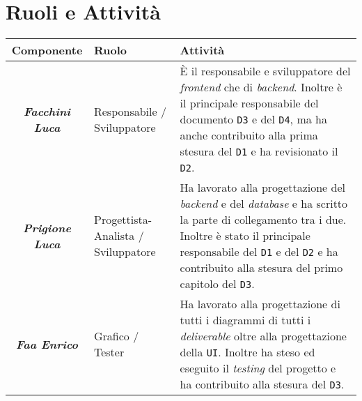 \chapter{Ruoli e Attività}
\begin{table}[H]
    \centering
    \begin{tabular}{|c|p{10em}|p{24em}|}
        \hline
        \textbf{Componente} & \textbf{Ruolo} & \textbf{Attività} \\
        \hline 
        \textbf{\textit{Facchini Luca}} & Responsabile / Sviluppatore & È il responsabile e sviluppatore del \textit{frontend} che di \textit{backend}. Inoltre è il principale responsabile del documento \texttt{D3} e del \texttt{D4}, ma ha anche contribuito alla prima stesura del \texttt{D1} e ha revisionato il \texttt{D2}. \\
        \hline
        \textbf{\textit{Prigione Luca}} & Progettista-Analista / Sviluppatore & Ha lavorato alla progettazione del \textit{backend} e del \textit{database} e ha scritto la parte di collegamento tra i due. Inoltre è stato il principale responsabile del \texttt{D1} e del \texttt{D2} e ha contribuito alla stesura del primo capitolo del \texttt{D3}. \\
        \hline
        \textbf{\textit{Faa Enrico}} & Grafico / Tester & Ha lavorato alla progettazione di tutti i diagrammi di tutti i \textit{deliverable} oltre alla progettazione della \texttt{UI}. Inoltre ha steso ed eseguito il \textit{testing} del progetto e ha contribuito alla stesura del \texttt{D3}. \\
        \hline
    \end{tabular}
\end{table}